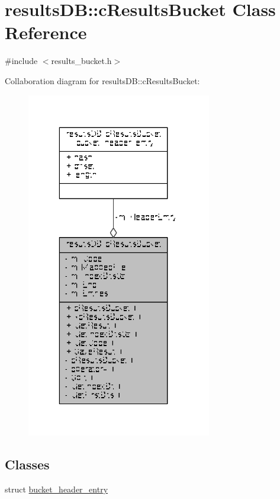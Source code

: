 \hypertarget{classresultsDB_1_1cResultsBucket}{\section{results\-D\-B\-:\-:c\-Results\-Bucket Class Reference}
\label{classresultsDB_1_1cResultsBucket}
}


{\ttfamily \#include $<$results\-\_\-bucket.\-h$>$}



Collaboration diagram for results\-D\-B\-:\-:c\-Results\-Bucket\-:
\nopagebreak
\begin{figure}[H]
\begin{center}
\leavevmode
\includegraphics[width=229pt]{classresultsDB_1_1cResultsBucket__coll__graph}
\end{center}
\end{figure}
\subsection*{Classes}
\begin{DoxyCompactItemize}
\item 
struct \hyperlink{structresultsDB_1_1cResultsBucket_1_1bucket__header__entry}{bucket\-\_\-header\-\_\-entry}
\end{DoxyCompactItemize}

